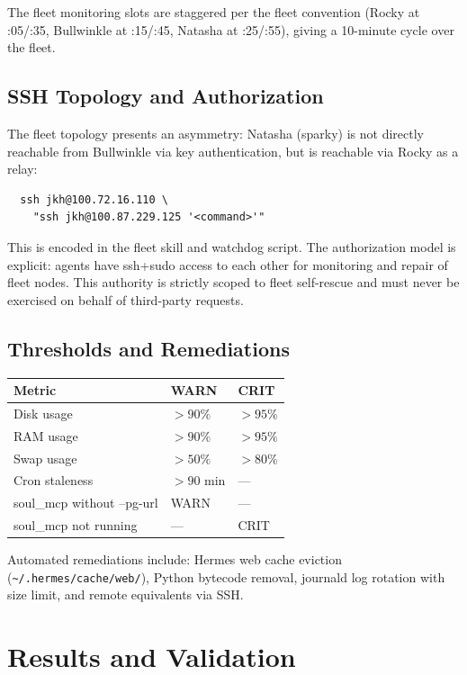 \documentclass[11pt]{article}
\begin{document}
The fleet monitoring slots are staggered per the fleet convention (Rocky at :05/:35, Bullwinkle at :15/:45, Natasha at :25/:55), giving a 10-minute cycle over the fleet.

\subsection{SSH Topology and Authorization}

The fleet topology presents an asymmetry: Natasha (sparky) is not directly reachable from Bullwinkle via key authentication, but is reachable via Rocky as a relay:

\begin{verbatim}
  ssh jkh@100.72.16.110 \
    "ssh jkh@100.87.229.125 '<command>'"
\end{verbatim}

This is encoded in the fleet skill and watchdog script. The authorization model is explicit: agents have ssh+sudo access to each other for monitoring and repair of fleet nodes. This authority is strictly scoped to fleet self-rescue and must never be exercised on behalf of third-party requests.

\subsection{Thresholds and Remediations}

\begin{center}
\begin{tabular}{lll}
\hline
\textbf{Metric} & \textbf{WARN} & \textbf{CRIT} \\
\hline
Disk usage & $>90\%$ & $>95\%$ \\
RAM usage & $>90\%$ & $>95\%$ \\
Swap usage & $>50\%$ & $>80\%$ \\
Cron staleness & $>90$ min & --- \\
soul\_mcp without --pg-url & WARN & --- \\
soul\_mcp not running & --- & CRIT \\
\hline
\end{tabular}
\end{center}

Automated remediations include: Hermes web cache eviction (\texttt{\~{}/.hermes/cache/web/}), Python bytecode removal, journald log rotation with size limit, and remote equivalents via SSH.

\section{Results and Validation}
\end{document}
